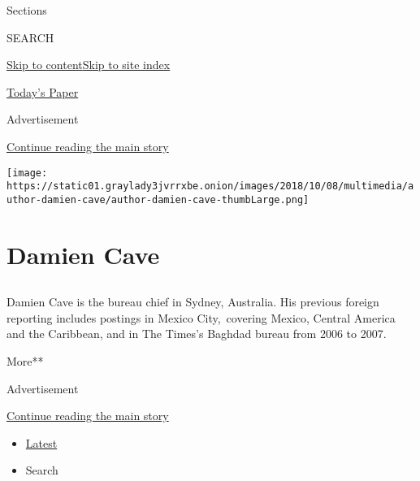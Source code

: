 Sections

SEARCH

\protect\hyperlink{site-content}{Skip to
content}\protect\hyperlink{site-index}{Skip to site index}

\href{https://myaccount.nytimes3xbfgragh.onion/auth/login?response_type=cookie\&client_id=vi}{}

\href{https://www.nytimes3xbfgragh.onion/section/todayspaper}{Today's
Paper}

Advertisement

\protect\hyperlink{after-top}{Continue reading the main story}

\texttt{[image: https://static01.graylady3jvrrxbe.onion/images/2018/10/08/multimedia/author-damien-cave/author-damien-cave-thumbLarge.png]}

\hypertarget{damien-cave}{%
\section{Damien Cave}\label{damien-cave}}

\subsection{}

Damien Cave is the bureau chief in Sydney, Australia. His previous
foreign reporting includes postings in Mexico City,~covering Mexico,
Central America and the Caribbean, and in The Times's Baghdad bureau
from 2006 to 2007.

More**

Advertisement

\protect\hyperlink{after-mid1}{Continue reading the main story}

\begin{itemize}
\tightlist
\item
  \protect\hyperlink{stream-panel}{Latest}
\item
  Search
\end{itemize}

